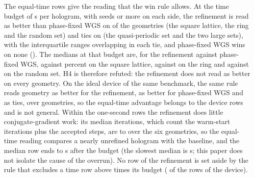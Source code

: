 The equal-time rows give the reading that the win rule allows. At the time budget of \benchOneTimeBudget{} s per hologram, with \benchOneWinMinSeeds{} seeds or more on each side, the refinement is read as better than phase-fixed WGS on \benchOneDevTimeProposed{} of the \benchOneDevCells{} geometries (the square lattice, the ring and the random set) and ties on \benchOneDevTimeTie{} (the quasi-periodic set and the two large sets), with the interquartile ranges overlapping in each tie, and phase-fixed WGS wins on none (\benchOneDevTimePublished{}). The medians at that budget are, for the refinement against phase-fixed WGS, \benchTimeSigRefGeoOne{} against \benchTimeSigMsevenGeoOne{} percent on the square lattice, \benchTimeSigRefGeoTwo{} against \benchTimeSigMsevenGeoTwo{} on the ring and \benchTimeSigRefGeoThree{} against \benchTimeSigMsevenGeoThree{} on the random set. H4 is therefore refuted: the refinement does not read as better on every geometry. On the ideal device of the same benchmark, the same rule reads \benchOneIdealTimeProposed{} geometry as better for the refinement, \benchOneIdealTimePublished{} as better for phase-fixed WGS and \benchOneIdealTimeTie{} as ties, over \benchOneIdealCells{} geometries, so the equal-time advantage belongs to the device rows and is not general. Within the one-second rows the refinement does little conjugate-gradient work: its median iterations, which count the \parWarm{} warm-start iterations plus the accepted steps, are \benchOneSecItersMin{} to \benchOneSecItersMax{} over the six geometries, so the equal-time reading compares a nearly unrefined hologram with the baseline, and the median row ends \benchOneSecOverrunMin{} to \benchOneSecOverrunMax{} s after the budget (the slowest median is \benchOneSecTimeMax{} s; this paper does not isolate the cause of the overrun). No row of the refinement is set aside by the rule that excludes a time row above \benchOverFactor{} times its budget (\benchOneSecOverN{} of the \benchOneDevCells{} rows of the device).

